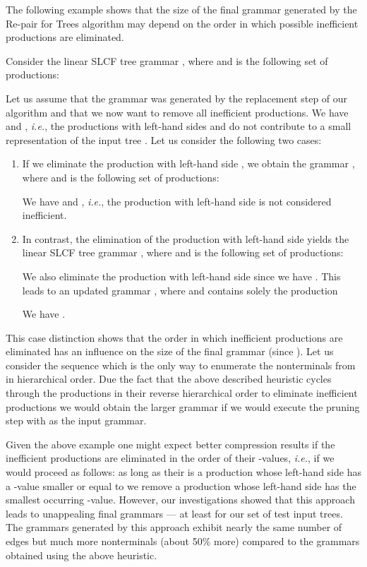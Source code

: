 \documentclass[12pt]{llncs}
\newcommand{\hairsp}{\hspace{1pt}}\newcommand{\TODO}{\textcolor{red}{\bf TODO!}\xspace}
\newcommand{\ie}{\mbox{\textit{i.\hairsp{}e.}}\xspace}
\begin{document}
The following example shows that the size of the final grammar generated by the Re-pair for Trees algorithm may depend on the order in which possible inefficient productions are eliminated.
\begin{example}\label{ex:differentOrdersPruningStep}
	Consider the linear SLCF tree grammar , where  and  is the following set of productions:
	
	Let us assume that the grammar  was generated by the replacement step of our algorithm and that we now want to remove all inefficient productions. We have  and , \ie, the productions with left-hand sides  and  do not contribute to a small representation of the input tree . Let us consider the following two cases:
	\begin{enumerate}[(1)]
		\item If we eliminate the production with left-hand side , we obtain the grammar , where  and  is the following set of productions:
			
			We have  and , \ie, the production with left-hand side  is not considered inefficient.
		\item In contrast, the elimination of the production with left-hand side  yields the linear SLCF tree grammar , where  and  is the following set of productions:
			
			We also eliminate the production with left-hand side  since we have . This leads to an updated grammar , where  and  contains solely the production
			
			We have .
	\end{enumerate}
	This case distinction shows that the order in which inefficient productions are eliminated has an influence on the size of the final grammar (since ). Let us consider the sequence  which is the only way to enumerate the nonterminals from  in hierarchical order. Due the fact that the above described heuristic cycles through the productions in their reverse hierarchical order to eliminate inefficient productions we would obtain the larger grammar  if we would execute the pruning step with  as the input grammar.
\end{example}
Given the above example one might expect better compression results if the inefficient productions are eliminated in the order of their -values, \ie, if we would proceed as follows: as long as their is a production whose left-hand side has a -value smaller or equal to  we remove a production whose left-hand side has the smallest occurring -value. However, our investigations showed that this approach leads to unappealing final grammars --- at least for our set of test input trees. The grammars generated by this approach exhibit nearly the same number of edges but much more nonterminals (about 50\% more) compared to the grammars obtained using the above heuristic.
\end{document}
